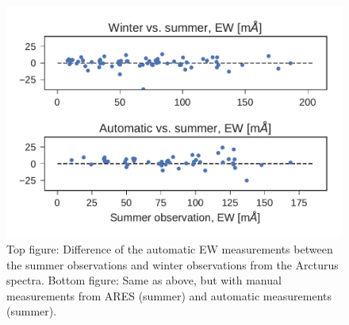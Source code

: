 \documentclass{aa}
\begin{document}
\begin{figure}[htpb!]
    \centering
    \includegraphics[width=1.0\linewidth]{figures/EWcomp.pdf}
    \caption{Top figure: Difference of the automatic EW measurements between the
             summer observations and winter observations from the Arcturus
             spectra. Bottom figure: Same as above, but with manual
             measurements from ARES (summer) and automatic measurements (summer).}
    \label{fig:EWcomp}
\end{figure}
\end{document}
